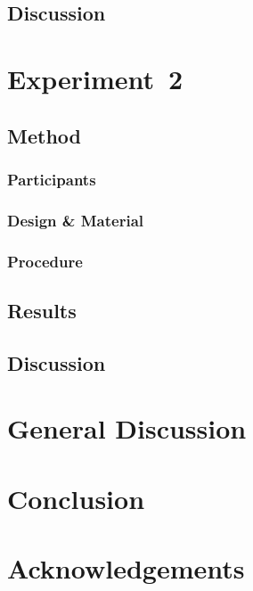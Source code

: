 \documentclass[a4paper,man,natbib,noextraspace]{apa6}
\begin{document}
\subsection{Discussion}

\section{Experiment~2}

\subsection{Method}

\subsubsection{Participants}

\subsubsection{Design \& Material}

\subsubsection{Procedure}

\subsection{Results}

\subsection{Discussion}

\section{General Discussion}

\section{Conclusion}









\section*{Acknowledgements}




\end{document}
